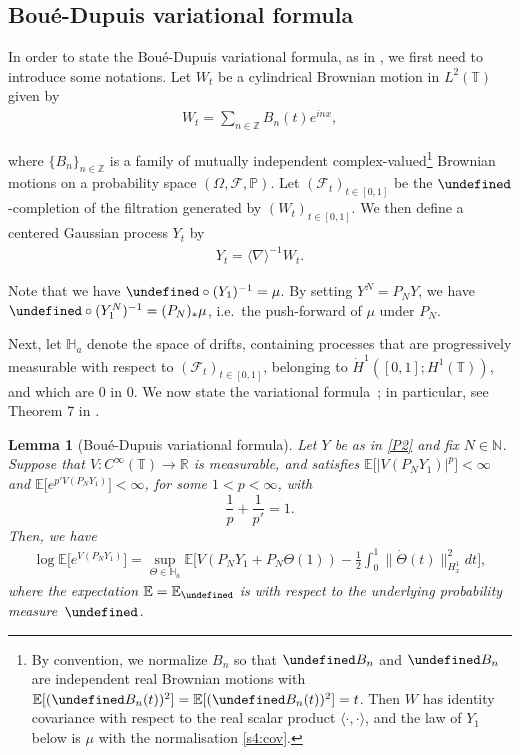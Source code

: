\documentclass[letterpaper, 11pt,  reqno]{amsart}
\newtheorem{lemma}[theorem]{Lemma}
\theoremstyle{definition}
\newcommand{\1}{\mathbbm 1}
\newcommand{\noi}{\noindent}
\newcommand{\Z}{\mathbb{Z}}
\newcommand{\R}{\mathbb{R}}
\newcommand{\T}{\mathbb{T}}
\newcommand{\0}{\mathbf 0}
\let\P= \undefined
\newcommand{\P}{\mathbb{P}}
\newcommand{\E}{\mathbb{E}}
\renewcommand{\O}{\Omega}
\newcommand{\jb}[1]
{\langle #1 \rangle}
\numberwithin{equation}{section}
\numberwithin{theorem}{section}
\newcommand{\HH}{\mathbb H_a}
\let\Re=\undefined\DeclareMathOperator*{\Re}{Re}
\let\Im=\undefined\DeclareMathOperator*{\Im}{Im}
\begin{document}
 
\subsection{Bou\'e-Dupuis variational formula} In order to state the Bou\'e-Dupuis variational formula,
as in \cite{BG,TolWeb, OOT1,OOT2, OST20}, we first need to introduce some notations.
Let $W_t$ be  a cylindrical Brownian motion in $L^2(\T)$
given by
\begin{align*}
W_t = \sum_{n \in \Z} B_n(t) e^{inx},
\end{align*}
 
 
\noi
where  
$\{B_n\}_{n \in \Z}$ is a family of mutually independent complex-valued\footnote{By convention, we normalize $B_n$ so that $\Re B_n$ and $\Im B_n$ are independent real Brownian motions with $\E[(\Re B_n(t))^2]=\E[(\Im B_n(t))^2]=t$. Then $W$ has identity covariance with respect to the real scalar product $\jb{\cdot,\cdot}$, and the law of $Y_1$ below is $\mu$ with the normalisation \eqref{s4:cov}.} Brownian motions on a probability space $(\O, \mathcal{F}, \mathbb{P})$. Let $(\mathcal{F}_t)_{t\in [0, 1]}$ be the
$\P$-completion of the filtration generated by 
$(W_t)_{t\in [0,1]}$.
We then define a centered Gaussian process $Y_t$
by 
\begin{align}
Y_t
=  \jb{\nabla}^{-1}W_t.
\label{P2}
\end{align}
 
 
 
 
\noi
Note that 
we have ${\P}\circ (Y_1)^{-1} = \mu$. By setting  $Y^N = P_N Y $, 
we have   $\P\circ (Y^N_1)^{-1} = (P_N)_*\mu$, 
i.e.~the push-forward of $\mu$ under $P_N$.
 
 
Next, let $\HH$ denote the space of drifts, 
containing processes that are progressively measurable 
with respect to $(\mathcal{F}_t)_{t\in [0,1]}$, 
belonging to 
$\dot H^1([0,1]; H^1(\T))$, and which are $0$ in $0$.
We now state the variational formula~\cite{BD, Ust};
in particular, see Theorem 7 in \cite{Ust}.
 
\begin{lemma}[Bou\'e-Dupuis variational formula]\label{LEM:var3}
	Let $Y$ be as in \eqref{P2} and fix $N \in \mathbb{N}$.
	Suppose that  $V:C^\infty(\T) \to \R$
	is measurable, and satisfies $\E\big[|V(P_NY_1)|^p\big] < \infty$
	and $\E\big[e^{p'V(P_NY_1)} \big] < \infty$, for some $1 < p < \infty$, with 
    $$ \frac1p + \frac 1 {p'} = 1.$$
	Then, we have
\begin{align} \label{BDN}
	\log \E\Big[e^{V(P_N Y_1)}\Big]
	= \sup_{\Theta \in \HH}
	\E\bigg[ V(P_N Y_1 + P_N \Theta(1)) - \frac{1}{2} \int_0^1 \| \dot\Theta(t) \|_{H^1_x}^2 dt \bigg],
\end{align}
where the expectation $\E = \E_\P$
is with respect to the underlying probability measure~$\P$. 
\end{lemma}
 
\end{document}

